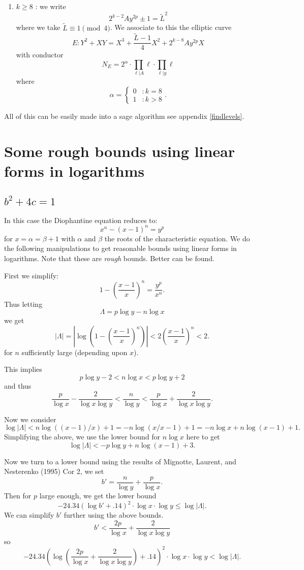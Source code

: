 \documentclass[12pt]{article}
\newcommand{\pfrac}[2]{\left( \frac{#1}{#2} \right)}
\begin{document}
\begin{enumerate}
\begin{enumerate}
\item $k \geq 8$ : we write
\[ 2^{k-2} A y^{2p} \pm 1  = \tilde{L}^2 \]
where we take $\tilde{L} \equiv 1 \pmod{4}$.  We associate to this the elliptic curve
\[ E: Y^2 + XY = X^3 + \frac{\tilde{L} -1}{4}X^2 + 2^{k-8}Ay^{2p}X \]
with conductor
\[ N_E = 2^\alpha \cdot \prod_{\ell | A} \ell \cdot \prod_{\ell | y} \ell \]
where 
\[ \alpha = \begin{cases} 0 & : k = 8 \\ 1 & : k > 8 \end{cases} .\]



\end{enumerate}

All of this can be easily made into a sage algorithm see appendix \ref{findlevels}.
\end{enumerate}

\section{Some rough bounds using linear forms in logarithms}

\subsection{$b^2+4c = 1$}

In this case the Diophantine equation reduces to:
\[ x^n - (x-1)^n = y^p \]
for $x = \alpha = \beta + 1$ with $\alpha$ and $\beta$ the roots of the characteristic equation.  We do the following manipulations to get reasonable bounds using linear forms in logarithms.  Note that these are \emph{rough} bounds.  Better can be found.

First we simplify:
\[ 1 - \pfrac{x-1}{x}^n = \frac{y^p}{x^n}. \]
Thus letting
\[ \Lambda = p\log{y} - n\log{x} \]
we get
\[ |\Lambda| = \left| \log{ \left( 1 - \pfrac{x-1}{x}^n \right) } \right| < 2\pfrac{x-1}{x}^n < 2. \]
for $n$ sufficiently large (depending upon $x$).

This implies
\[ p \log{y} - 2 < n\log{x} < p\log{y} +2 \]
and thus
\[ \frac{p}{\log{x}} - \frac{2}{\log{x}\log{y}} < \frac{n}{\log{y}} < \frac{p}{\log{x}} + \frac{2}{\log{x}\log{y}}. \]

Now we consider 
\[ \log{|\Lambda|} < n \log{((x-1)/x)} +1 = -n\log{(x/x-1)}+1 = -n\log{x} + n\log{(x-1)} +1. \]
Simplifying the above, we use the lower bound for $n\log{x}$ here to get 
\[ \log{|\Lambda|} < -p\log{y} + n\log{(x-1)} +3. \]

Now we turn to a lower bound using the results of Mignotte, Laurent, and Nesterenko (1995) Cor 2, we set
\[ b' = \frac{n}{\log{y}} + \frac{p}{\log{x}} .\]
Then for $p$ large enough, we get the lower bound
\[ -24.34 \left( \log{b'}+.14 \right)^2 \cdot \log{x} \cdot \log{y} \leq \log|\Lambda|. \]
We can simplify $b'$ further using the above bounds.
\[ b' < \frac{2p}{\log{x}} + \frac{2}{\log{x}\log{y}} \]
so
\[ -24.34 \left( \log{\left( \frac{2p}{\log{x}} + \frac{2}{\log{x}\log{y}} \right)}+.14 \right)^2 \cdot \log{x} \cdot \log{y} < \log|\Lambda|. \]
\end{document}
